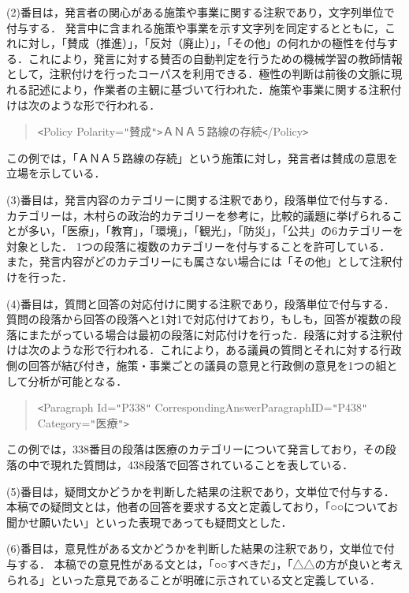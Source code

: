 \documentclass[japanese]{jnlp_1.4}
\begin{document}
(2)番目は，発言者の関心がある施策や事業に関する注釈であり，文字列単位で付与する．
発言中に含まれる施策や事業を示す文字列を同定するとともに，これに対し，「賛成（推進）」，「反対（廃止）」，「その他」の何れかの極性を付与する．これにより，発言に対する賛否の自動判定を行うための機械学習の教師情報として，注釈付けを行ったコーパスを利用できる．極性の判断は前後の文脈に現れる記述により，作業者の主観に基づいて行われた．施策や事業に関する注釈付けは次のような形で行われる．
\begin{quote}
\texttt{<}Policy Polarity=\verb/"/賛成\verb/"/\texttt{>}ＡＮＡ５路線の存続\texttt{<}/Policy\texttt{>}
\end{quote}

この例では，「ＡＮＡ５路線の存続」という施策に対し，発言者は賛成の意思を立場を示している．

(3)番目は，発言内容のカテゴリーに関する注釈であり，段落単位で付与する．
カテゴリーは，木村ら\cite{kim2}の政治的カテゴリーを参考に，比較的議題に挙げられることが多い，「医療」，「教育」，「環境」，「観光」，「防災」，「公共」の6カテゴリーを対象とした．
1つの段落に複数のカテゴリーを付与することを許可している．
また，発言内容がどのカテゴリーにも属さない場合には「その他」として注釈付けを行った．

(4)番目は，質問と回答の対応付けに関する注釈であり，段落単位で付与する．
質問の段落から回答の段落へと1対1で対応付けており，もしも，回答が複数の段落にまたがっている場合は最初の段落に対応付けを行った．段落に対する注釈付けは次のような形で行われる．これにより，ある議員の質問とそれに対する行政側の回答が結び付き，施策・事業ごとの議員の意見と行政側の意見を1つの組として分析が可能となる．
\begin{quote}
\texttt{<}Paragraph Id=\verb/"/P338\verb/"/ CorrespondingAnswerParagraphID=\verb/"/P438\verb/"/ Category=\verb/"/医療\verb/"/\texttt{>}
\end{quote}

この例では，338番目の段落は医療のカテゴリーについて発言しており，その段落の中で現れた質問は，438段落で回答されていることを表している．

(5)番目は，疑問文かどうかを判断した結果の注釈であり，文単位で付与する．
本稿での疑問文とは，他者の回答を要求する文と定義しており，「○○についてお聞かせ願いたい」といった表現であっても疑問文とした．

(6)番目は，意見性がある文かどうかを判断した結果の注釈であり，文単位で付与する．
本稿での意見性がある文とは，「○○すべきだ」，「△△の方が良いと考えられる」といった意見であることが明確に示されている文と定義している．
\end{document}
